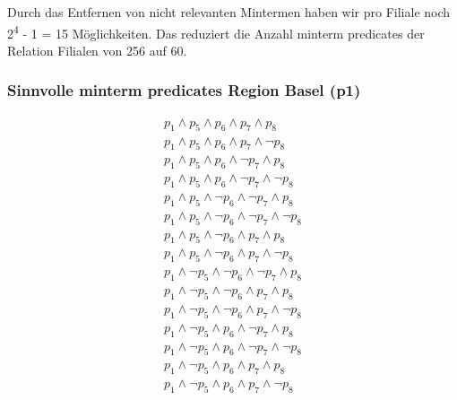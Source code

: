 \documentclass[11pt,a4paper,parskip=half]{scrartcl}
\begin{document}
Durch das Entfernen von nicht relevanten Mintermen haben wir pro Filiale noch 2\textsuperscript{4} - 1 = 15 Möglichkeiten. Das reduziert die Anzahl minterm predicates der Relation Filialen von 256 auf 60.

\subsubsection{Sinnvolle minterm predicates Region Basel (p1)}
\begin{align*}
p_1 \wedge p_5 \wedge p_6 \wedge p_7 \wedge p_8\\
p_1 \wedge p_5 \wedge p_6 \wedge p_7 \wedge \neg p_8\\
p_1 \wedge p_5 \wedge p_6 \wedge \neg p_7 \wedge p_8\\
p_1 \wedge p_5 \wedge p_6 \wedge \neg p_7 \wedge \neg p_8\\
p_1 \wedge p_5 \wedge \neg p_6 \wedge \neg p_7 \wedge p_8\\
p_1 \wedge p_5 \wedge \neg p_6 \wedge \neg p_7 \wedge \neg p_8\\
p_1 \wedge p_5 \wedge \neg p_6 \wedge  p_7 \wedge p_8\\
p_1 \wedge p_5 \wedge \neg p_6 \wedge  p_7 \wedge \neg p_8\\
p_1 \wedge \neg p_5 \wedge \neg p_6 \wedge \neg p_7 \wedge p_8\\
p_1 \wedge \neg p_5 \wedge \neg p_6 \wedge  p_7 \wedge p_8\\
p_1 \wedge \neg p_5 \wedge \neg p_6 \wedge  p_7 \wedge \neg p_8\\
p_1 \wedge \neg p_5 \wedge  p_6 \wedge \neg p_7 \wedge p_8\\
p_1 \wedge \neg p_5 \wedge  p_6 \wedge \neg p_7 \wedge \neg p_8\\
p_1 \wedge \neg p_5 \wedge  p_6 \wedge  p_7 \wedge  p_8\\
p_1 \wedge \neg p_5 \wedge  p_6 \wedge  p_7 \wedge \neg p_8\\
\end{align*}
\end{document}
